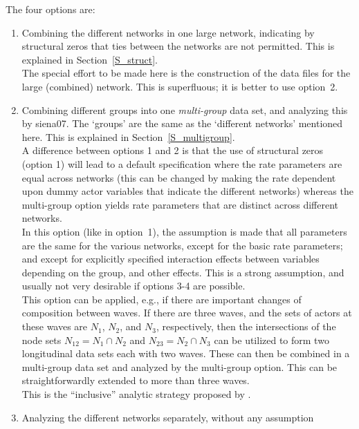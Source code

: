 \documentclass[a4paper,fleqn,11pt]{article}
\newcommand{\+}{\, + \,}
\begin{document}
\noindent
The four options are:
\begin{enumerate}
\item Combining the different networks in one large network,
      indicating by structural zeros that ties between the
      networks are not permitted.
      This is explained in Section~\ref{S_struct}.\\
      The special effort to be made here is the construction
      of the data files for the large (combined) network.
      This is superfluous; it is better to use option~2.
\item Combining different groups
      into one \emph{multi-group} data set,
      and analyzing this by \textsf{siena07}.
      The `groups' are the same as the `different networks'
      mentioned here.
      This is explained in Section~\ref{S_multigroup}.\\
      A difference between options 1 and 2 is that the use
      of structural zeros (option 1) will lead to a default specification
      where the rate parameters are equal across networks
      (this can be changed by making the rate dependent upon dummy actor
      variables that indicate the different networks)
      whereas the multi-group option yields rate parameters
      that are distinct across different networks.\\
      In this option (like in option~1), the assumption is made that all
      parameters are the same for the various networks,
      except for the basic rate parameters;
      and except for explicitly specified interaction
      effects between variables depending on the group, and other effects.
      This is a strong assumption, and usually not very desirable if
      options 3-4 are possible.\\
      This option can be applied, e.g., if there are important changes
      of composition between waves. If there are three waves, and
      the sets of actors at these waves are $N_1$, $N_2$, and $N_3$,
      respectively, then the intersections of the node sets
      $N_{12} = N_1 \cap N_2$ and $N_{23} = N_2 \cap N_3$ can be
      utilized to form two longitudinal data sets each with two waves.
      These can then be combined in a multi-group data set
      and analyzed by the multi-group option.
      This can be straightforwardly extended to more than three waves.
      \\
      This is the ``inclusive'' analytic strategy
      proposed by \citet{delaHayeETAl2017}.
\item Analyzing the different networks separately, without any assumption

\end{enumerate}
\end{document}

